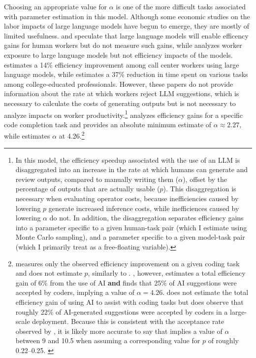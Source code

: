 \documentclass{article}
\begin{document}
Choosing an appropriate value for $\alpha$ is one of the more difficult tasks associated with parameter estimation in this model. Although some economic studies on the labor impacts of large language models have begun to emerge, \cite{brynjolfsson, codemodels, gptsasgpts, github, korinek, mit, googleproductivity} they are mostly of limited usefulness. \cite{codemodels} and \cite{korinek} speculate that large language models will enable efficency gains for human workers but do not measure such gains, while \cite{gptsasgpts} analyzes worker exposure to large language models but not efficiency impacts of the models. \cite{brynjolfsson} estimates a 14\% efficiency improvement among call center workers using large language models, while \cite{mit} estimates a 37\% reduction in time spent on various tasks among college-educated professionals. However, these papers do not provide information about the rate at which workers reject LLM suggestions, which is necessary to calculate the costs of generating outputs but is not necessary to analyze impacts on worker productivity.\footnote{In this model, the efficiency speedup associated with the use of an LLM is disaggregated into an increase in the rate at which humans can generate and review outputs, compared to manually writing them ($\alpha$), offset by the percentage of outputs that are actually usable ($p$). This disaggregation is necessary when evaluating operator costs, because inefficiencies caused by lowering $p$ generate increased inference costs, while inefficiences caused by lowering $\alpha$ do not. In addition, the disaggregation separates efficiency gains into a parameter specific to a given human-task pair (which I estimate using Monte Carlo sampling), and a parameter specific to a given model-task pair (which I primarily treat as a free-floating variable).} \cite{github} analyzes efficiency gains for a specific code completion task and provides an absolute minimum estimate of $\alpha \approx 2.27$, while \cite{googleproductivity} estimates $\alpha$ at 4.26.\footnote{\cite{github} measures only the observed efficiency improvement on a given coding task and does not estimate $p$, similarly to \cite{brynjolfsson}. \cite{googleproductivity}, however, estimates a total efficiency gain of 6\% from the use of AI \textbf{and} finds that 25\% of AI suggestions were accepted by coders, implying a value of $\alpha = 4.26$. \cite{meta} does not estimate the total efficiency gain of using AI to assist with coding tasks but does observe that roughly 22\% of AI-generated suggestions were accepted by coders in a large-scale deployment. Because this is consistent with the acceptance rate observed by \cite{googleproductivity}, it is likely more accurate to say that \cite{github} implies a value of $\alpha$ between 9 and 10.5 when assuming a corresponding value for $p$ of roughly 0.22–0.25. \label{efficiency}}
\end{document}
